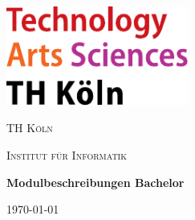 
\begin{titlepage}
	\centering
	\includegraphics[width=0.45\textwidth]{../../../assets/logo_th_koeln.pdf}\par\vspace{1cm}
	{\scshape\LARGE TH Köln \par}
	\vspace{1cm}
	{\scshape\Large Institut für Informatik\par}
	\vspace{1.5cm}
	{\huge\bfseries Modulbeschreibungen Bachelor\par}

	\vfill

	{\large \today\par}
\end{titlepage}